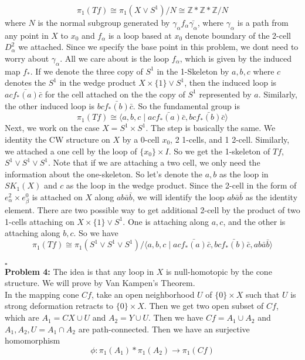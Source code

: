 \documentclass[12pt]{amsart}
\newcommand{\Z}{\mathbb{Z}}
\begin{document}
\[\pi_1(Tf)\cong \pi_1(X\vee S^1)/N\cong \Z\ast \Z\ast \Z/N\]
where $N$ is the normal subgroup generated by $\gamma_\alpha f_\alpha \bar{\gamma_\alpha}$, where $\gamma_\alpha$ is a path from any point in $X$ to $x_0$ and $f_\alpha$ is a loop based at $x_0$ denote boundary of the 2-cell $D^2_\alpha $ we attached. Since we specify the base point in this problem, we dont need to worry about $\gamma_{\alpha}$. All we care about is the loop $f_\alpha$, which is given by the induced map $f_\ast$. If we denote the three copy of $S^1$ in the 1-Skeleton by $a,b,c$ where $c$ denotes the $S^1$ in the wedge product $X\times \{1\}\vee S^1$, then the induced loop is $ac\bar{f_\ast(a)}\bar{c}$ for the cell attached on the the copy of $S^1$ represented by $a$. Similarly, the other induced loop is $bc\bar{f_\ast(b)}\bar{c}$. So the fundamental group is 
\[\pi_1(Tf)\cong \langle a,b,c\mid ac\bar{f_\ast(a)}\bar{c},bc\bar{f_\ast(b)}\bar{c}\rangle\]
Next, we work on the case $X=S^1\times S^1$. The step is basically the same. We identity the CW structure on $X$ by a 0-cell $x_0$, 2 1-cells, and 1 2-cell. Similarly, we attached a one cell by the loop of $\{x_0\}\times I$. So we get the 1-skeleton of $Tf$, $S^1\vee S^1\vee S^1$. Note that if we are attaching a two cell, we only need the information about the one-skeleton. So let's denote the $a,b$ as the loop in $SK_1(X)$ and $c$ as the loop in the wedge product. Since the 2-cell in the form of $e^2_\alpha\times e^0_\beta$ is attached on $X$ along $ab\bar{a}\bar{b}$, we will identify the loop $ab\bar{a}\bar{b}$ as the identity element. There are two possible way to get additional 2-cell by the product of two 1-cells attaching on $X\times \{1\}\vee S^1$. One is attaching along $a,c$, and the other is attaching along $b,c$. So we have 
\[\pi_1(Tf)\cong\pi_1(S^1\vee S^1\vee S^1)/\langle a,b,c\mid ac\bar{f_\ast(a)}\bar{c},bc\bar{f_\ast(b)}\bar{c}, ab\bar{a}\bar{b}\rangle \]
\\\phantom{qed}\hfill$\square$\\
\textbf{Problem 4:} The idea is that any loop in $X$ is null-homotopic by the cone structure. We will prove by Van Kampen's Theorem.\\
In the mapping cone $Cf$, take an open neighborhood $U$ of $\{0\}\times X$ such that $U$ is strong deformation retracts to $\{0\}\times X$. Then we get two open subset of $Cf$, which are $A_1=CX \cup U$ and $A_2=Y\cup U$. Then we have $Cf=A_1\cup A_2$ and $A_1,A_2,U=A_1\cap A_2$ are path-connected. Then we have an surjective homomorphism
\[\phi:\pi_1(A_1)\ast \pi_1(A_2)\to \pi_1(Cf)\]
\end{document}
